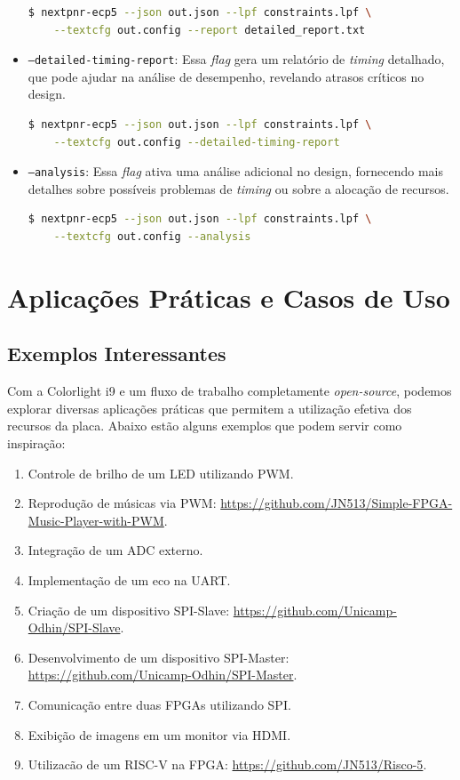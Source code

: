 \documentclass{report}
\begin{document}
\begin{itemize}
\begin{lstlisting}[language=bash]
$ nextpnr-ecp5 --json out.json --lpf constraints.lpf \
    --textcfg out.config --report detailed_report.txt
\end{lstlisting}

\item \texttt{--detailed-timing-report}: Essa \textit{flag} gera um relatório de \textit{timing} detalhado, que pode ajudar na análise de desempenho, revelando atrasos críticos no design.

\begin{lstlisting}[language=bash]
$ nextpnr-ecp5 --json out.json --lpf constraints.lpf \
    --textcfg out.config --detailed-timing-report
\end{lstlisting}

\item \texttt{--analysis}: Essa \textit{flag} ativa uma análise adicional no design, fornecendo mais detalhes sobre possíveis problemas de \textit{timing} ou sobre a alocação de recursos.

\begin{lstlisting}[language=bash]
$ nextpnr-ecp5 --json out.json --lpf constraints.lpf \
    --textcfg out.config --analysis
\end{lstlisting}
\end{itemize}

\chapter{Aplicações Práticas e Casos de Uso}

\section{Exemplos Interessantes}

Com a Colorlight i9 e um fluxo de trabalho completamente \textit{open-source}, podemos explorar diversas aplicações práticas que permitem a utilização efetiva dos recursos da placa. Abaixo estão alguns exemplos que podem servir como inspiração:

\begin{enumerate}
    \item Controle de brilho de um LED utilizando PWM.
    \item Reprodução de músicas via PWM: \url{https://github.com/JN513/Simple-FPGA-Music-Player-with-PWM}.
    \item Integração de um ADC externo.
    \item Implementação de um eco na UART.
    \item Criação de um dispositivo SPI-Slave: \url{https://github.com/Unicamp-Odhin/SPI-Slave}.
    \item Desenvolvimento de um dispositivo SPI-Master: \url{https://github.com/Unicamp-Odhin/SPI-Master}.
    \item Comunicação entre duas FPGAs utilizando SPI.
    \item Exibição de imagens em um monitor via HDMI.
    \item Utilizacão de um RISC-V na FPGA: \url{https://github.com/JN513/Risco-5}.
\end{enumerate}
\end{document}
